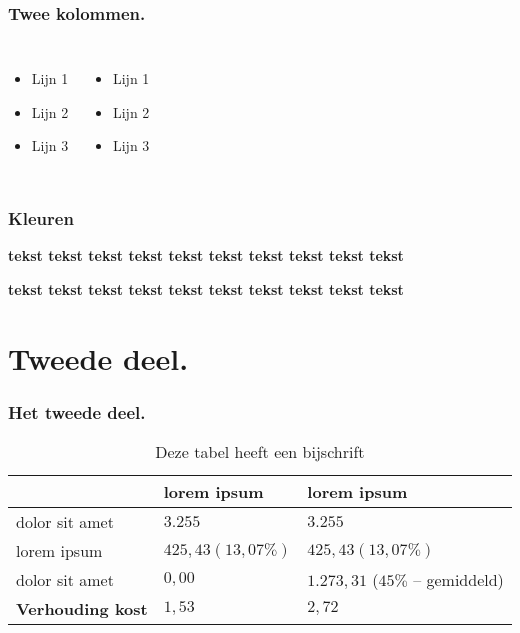 \documentclass[aspectratio=169]{beamer}
\begin{document}
\begin{frame}
    \frametitle{Twee kolommen.}

    \begin{columns}[c]
        \begin{itemize}
            \item Lijn 1
            \item Lijn 2
            \item Lijn 3
        \end{itemize}

        \begin{itemize}
            \item Lijn 1
            \item Lijn 2
            \item Lijn 3
        \end{itemize}
    \end{columns}
\end{frame}

\begin{frame}
    \frametitle{Kleuren}

    \textbf{\textcolor{hgdarkgreen}{tekst}
    \textcolor{hgpink}{tekst}
    \textcolor{hgochre}{tekst}
    \textcolor{hgorange}{tekst}
    \textcolor{hgpurple}{tekst}
    \textcolor{hgblue}{tekst}
    \textcolor{hglightgreen}{tekst}
    \textcolor{hgbrown}{tekst}
    \textcolor{hggrey}{tekst}
    \textcolor{hgyellow}{tekst}}

    \textbf{\colorbox{hgdarkgreen}{tekst}
    \colorbox{hgpink}{tekst}
    \colorbox{hgochre}{tekst}
    \colorbox{hgorange}{tekst}
    \colorbox{hgpurple}{tekst}
    \colorbox{hgblue}{tekst}
    \colorbox{hglightgreen}{tekst}
    \colorbox{hgbrown}{tekst}
    \colorbox{hggrey}{tekst}
    \colorbox{hgyellow}{tekst}}
\end{frame}

\section{Tweede deel.}

\begin{frame}
\frametitle{Het tweede deel.}

\begin{table}
    \begin{tabular}{lll}
    \toprule
                    & \textbf{lorem ipsum} & \textbf{lorem ipsum} \\
    \midrule
    dolor sit amet & $3.255$              & $3.255$ \\
    \midrule
    lorem ipsum    & $425,43 (13,07\%)$   & $425,43 (13,07\%)$ \\
    \midrule
    dolor sit amet & $0,00$               & $1.273,31$ ($45\%$ -- gemiddeld)\\
    \midrule
    \textbf{{\small Verhouding kost}} & \textbf{$1,53$} & \textbf{$2,72$}\\
    \bottomrule
    \end{tabular}

    \label{tab:voorbeeld}
    \caption{Deze tabel heeft een bijschrift}
    \end{table}
\end{frame}
\end{document}
